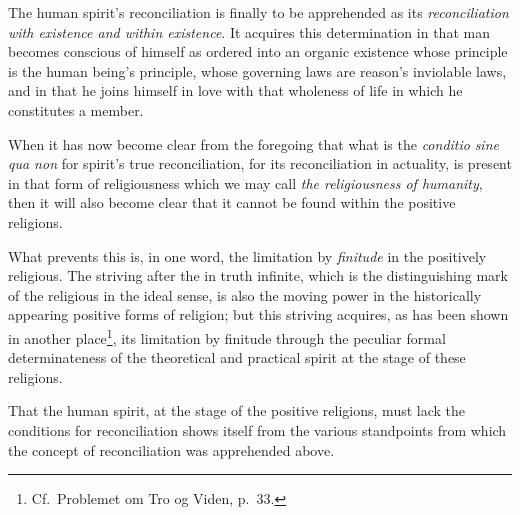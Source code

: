 \documentclass[12pt,a4paper]{book}
\begin{document}
The human spirit's reconciliation is finally to be apprehended as its
\emph{reconciliation with existence and within existence}. It acquires this
determination in that man becomes conscious of himself as ordered into an
organic existence whose principle is the human being's principle, whose
governing laws are reason's inviolable laws, and in that he joins himself in
love with that wholeness of life in which he constitutes a member.

When it has now become clear from the foregoing that what is the
\textit{conditio} \emph{\textit{sine qua non}} for spirit's true
reconciliation, for its reconciliation in actuality, is present in that form
of religiousness which we may call \emph{the religiousness of humanity}, then
it will also become clear that it cannot be found within the positive
religions.

What prevents this is, in one word, the limitation by \emph{finitude} in the
positively religious. The striving after the in truth infinite, which is the
distinguishing mark of the religious in the ideal sense, is also the moving
power in the historically appearing positive forms of religion; but
\setcounter{footnote}{0}%
this striving acquires, as has been shown in another place\footnote{Cf.\
Problemet om Tro og Viden, p.\ 33.}, its limitation by finitude through the
peculiar formal determinateness of the theoretical and practical spirit at the
stage of these religions.

That the human spirit, at the stage of the positive religions, must lack the
conditions for reconciliation shows itself from the various standpoints from
which the concept of reconciliation was apprehended above.
\end{document}
